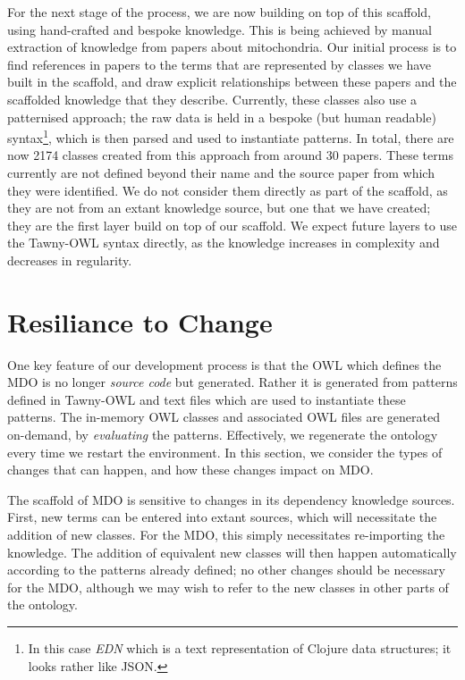 \documentclass{icbo}
\newcommand{\tawny}{Tawny-OWL\xspace}
\begin{document}
For the next stage of the process, we are now building on top of this
scaffold, using hand-crafted and bespoke knowledge. This is being
achieved by manual extraction of knowledge from papers about
mitochondria. Our initial process is to find references in papers to
the terms that are represented by classes we have built in the
scaffold, and draw explicit relationships between these papers and the
scaffolded knowledge that they describe. Currently, these classes also
use a patternised approach; the raw data is held in a bespoke (but
human readable) syntax\footnote{In this case \textit{EDN} which is a
  text representation of Clojure data structures; it looks rather like
  JSON.}, which is then parsed and used to instantiate patterns. In
total, there are now 2174 classes created from this approach from
around 30 papers. These terms currently are not defined beyond their
name and the source paper from which they were identified. We do not
consider them directly as part of the scaffold, as they are not from
an extant knowledge source, but one that we have created; they are the
first layer build on top of our scaffold. We expect future layers to
use the \tawny syntax directly, as the knowledge increases in
complexity and decreases in regularity.

\section{Resiliance to Change}
\label{sec:resiliance-change}

One key feature of our development process is that the OWL which
defines the MDO is no longer \textit{source code} but
generated. Rather it is generated from patterns defined in \tawny and
text files which are used to instantiate these patterns. The in-memory
OWL classes and associated OWL files are generated on-demand, by
\textit{evaluating} the patterns. Effectively, we regenerate the
ontology every time we restart the environment. In this section, we
consider the types of changes that can happen, and how these changes
impact on MDO.

The scaffold of MDO is sensitive to changes in its dependency
knowledge sources. First, new terms can be entered into extant
sources, which will necessitate the addition of new classes. For the
MDO, this simply necessitates re-importing the knowledge. The addition
of equivalent new classes will then happen automatically according to
the patterns already defined; no other changes should be necessary for
the MDO, although we may wish to refer to the new classes in other
parts of the ontology.
\end{document}
